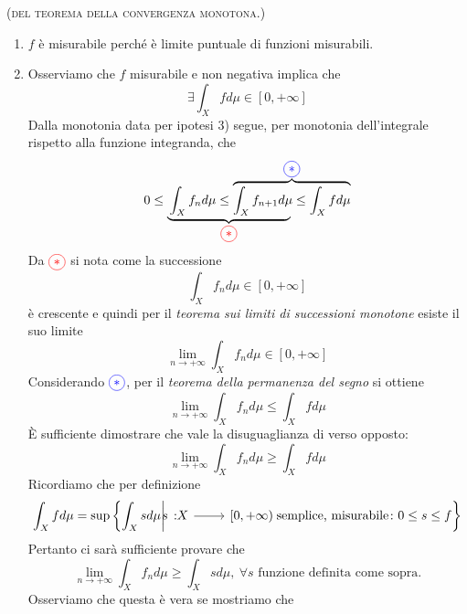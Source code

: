 \begin{demonstration}\textsc{(del teorema della convergenza monotona.)}
	\begin{enumerate}[label=\Roman*]
		\item $f$ è misurabile perché è limite puntuale di funzioni misurabili.
		\item Osserviamo che $f$ misurabile e non negativa implica che
		\begin{equation*}
			\exists\int_Xfd\mu\in\left[0,+\infty\right]
		\end{equation*}
		Dalla monotonia data per ipotesi 3) segue, per monotonia dell'integrale rispetto alla funzione integranda, che
	\begin{equation*}
		0\leq\lefteqn{\underbrace{\phantom{\int_Xf_nd\mu\leq\int_Xf_{n+1}d\mu}}_{\textcolor{red}{\circled{\ast}}}}\int_Xf_nd\mu\leq
		\overbrace{\int_Xf_{n+1}d\mu\leq \int_Xfd\mu}^{\textcolor{blue}{\circled{\ast}}}
	\end{equation*}
		Da $\textcolor{red}{\circled{\ast}}$ si nota come la successione
	\begin{equation*}
		\int_Xf_nd\mu\in\left[0,+\infty\right]
	\end{equation*}
		è crescente e quindi per il \textit{teorema sui limiti di successioni monotone} esiste il suo limite %
\begin{equation*}
	\lim_{n\to+\infty}\int_Xf_nd\mu\in\left[0,+\infty\right]
\end{equation*}
Considerando $\textcolor{blue}{\circled{\ast}}$, per il \textit{teorema della permanenza del segno} si ottiene
\begin{equation*}
	\lim_{n\to+\infty}\int_Xf_nd\mu\leq \int_Xfd\mu
\end{equation*}
È sufficiente dimostrare che vale la disuguaglianza di verso opposto:
\begin{equation*}
	\lim_{n\to+\infty}\int_Xf_nd\mu\geq \int_Xfd\mu
\end{equation*}
Ricordiamo che per definizione
\begin{equation*}
	\int_Xfd\mu=\sup\left\{\int_Xsd\mu\middle| \funz{s}{X}{\left[0,+\infty\right)}\text{ semplice, misurabile}\colon0\leq s\leq f\right\}
\end{equation*}
Pertanto ci sarà sufficiente provare che
\begin{equation*}
	\lim_{n\to+\infty}\int_Xf_nd\mu\geq \int_Xsd\mu,\ \forall s\text{ funzione definita come sopra.}
\end{equation*}
Osserviamo che questa è vera se mostriamo che

\end{enumerate}
\end{demonstration}
